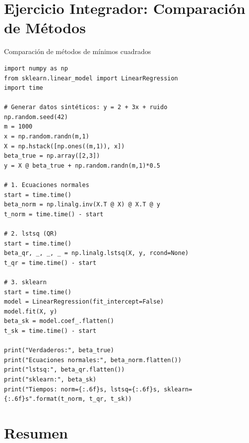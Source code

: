 \documentclass[aspectratio=169, 10pt, xcolor=table]{beamer}
\begin{document}
\section{Ejercicio Integrador: Comparación de Métodos}

\begin{frame}[fragile]{Comparación de métodos de mínimos cuadrados}
    \begin{lstlisting}
import numpy as np
from sklearn.linear_model import LinearRegression
import time

# Generar datos sintéticos: y = 2 + 3x + ruido
np.random.seed(42)
m = 1000
x = np.random.randn(m,1)
X = np.hstack([np.ones((m,1)), x])
beta_true = np.array([2,3])
y = X @ beta_true + np.random.randn(m,1)*0.5

# 1. Ecuaciones normales
start = time.time()
beta_norm = np.linalg.inv(X.T @ X) @ X.T @ y
t_norm = time.time() - start

# 2. lstsq (QR)
start = time.time()
beta_qr, _, _, _ = np.linalg.lstsq(X, y, rcond=None)
t_qr = time.time() - start

# 3. sklearn
start = time.time()
model = LinearRegression(fit_intercept=False)
model.fit(X, y)
beta_sk = model.coef_.flatten()
t_sk = time.time() - start

print("Verdaderos:", beta_true)
print("Ecuaciones normales:", beta_norm.flatten())
print("lstsq:", beta_qr.flatten())
print("sklearn:", beta_sk)
print("Tiempos: norm={:.6f}s, lstsq={:.6f}s, sklearn={:.6f}s".format(t_norm, t_qr, t_sk))
    \end{lstlisting}
\end{frame}

\section{Resumen}
\end{document}
